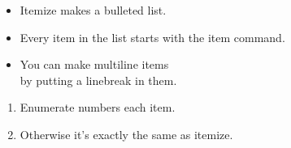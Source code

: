 \documentclass{article}
\begin{document}
\begin{itemize}
        \item Itemize makes a bulleted list.
        \item Every item in the list starts with
                the item command.
        \item You can make multiline items\\
                by putting a linebreak in them.
\end{itemize}

\begin{enumerate}
        \item Enumerate numbers each item.
        \item Otherwise it's exactly the same as itemize.
\end{enumerate}
\end{document}
